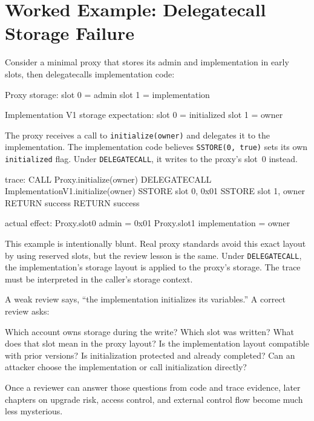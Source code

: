 \section{Worked Example: Delegatecall Storage Failure}

Consider a minimal proxy that stores its admin and implementation in early slots, then delegatecalls implementation code:

\begin{codeblock}
Proxy storage:
    slot 0 = admin
    slot 1 = implementation

Implementation V1 storage expectation:
    slot 0 = initialized
    slot 1 = owner
\end{codeblock}

The proxy receives a call to \texttt{initialize(owner)} and delegates it to the implementation. The implementation code believes \texttt{SSTORE(0, true)} sets its own \texttt{initialized} flag. Under \texttt{DELEGATECALL}, it writes to the proxy's slot~0 instead.

\begin{codeblock}
trace:
    CALL Proxy.initialize(owner)
        DELEGATECALL ImplementationV1.initialize(owner)
            SSTORE slot 0, 0x01
            SSTORE slot 1, owner
        RETURN success
    RETURN success

actual effect:
    Proxy.slot0 admin = 0x01
    Proxy.slot1 implementation = owner
\end{codeblock}

This example is intentionally blunt. Real proxy standards avoid this exact layout by using reserved slots, but the review lesson is the same. Under \texttt{DELEGATECALL}, the implementation's storage layout is applied to the proxy's storage. The trace must be interpreted in the caller's storage context.

A weak review says, ``the implementation initializes its variables.'' A correct review asks:

\begin{codeblock}
Which account owns storage during the write?
Which slot was written?
What does that slot mean in the proxy layout?
Is the implementation layout compatible with prior versions?
Is initialization protected and already completed?
Can an attacker choose the implementation or call initialization directly?
\end{codeblock}

Once a reviewer can answer those questions from code and trace evidence, later chapters on upgrade risk, access control, and external control flow become much less mysterious.

